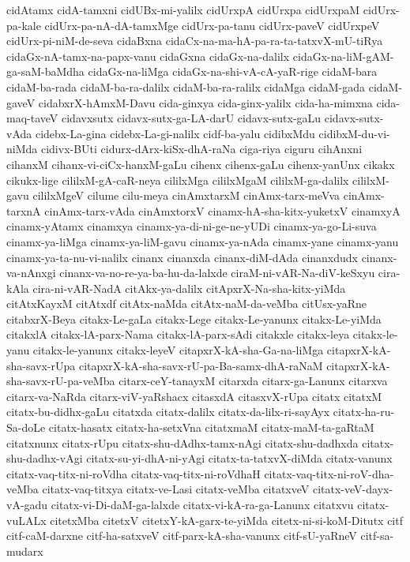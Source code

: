 {cidAtamx
cidA-tamxni
cidUBx-mi-yalilx
cidUrxpA
cidUrxpa
cidUrxpaM
cidUrx-pa-kale
cidUrx-pa-nA-dA-tamxMge
cidUrx-pa-tanu
cidUrx-paveV
cidUrxpeV
cidUrx-pi-niM-de-seva
cidaBxna
cidaCx-na-ma-hA-pa-ra-ta-tatxvX-mU-tiRya
cidaGx-nA-tamx-na-papx-vanu
cidaGxna
cidaGx-na-dalilx
cidaGx-na-liM-gAM-ga-saM-baMdha
cidaGx-na-liMga
cidaGx-na-shi-vA-cA-yaR-rige
cidaM-bara
cidaM-ba-rada
cidaM-ba-ra-dalilx
cidaM-ba-ra-ralilx
cidaMga
cidaM-gada
cidaM-gaveV
cidabxrX-hAmxM-Davu
cida-ginxya
cida-ginx-yalilx
cida-ha-mimxna
cida-maq-taveV
cidavxsutx
cidavx-sutx-ga-LA-darU
cidavx-sutx-gaLu
cidavx-sutx-vAda
cidebx-La-gina
cidebx-La-gi-nalilx
cidf-ba-yalu
cidibxMdu
cidibxM-du-vi-niMda
cidivx-BUti
cidurx-dArx-kiSx-dhA-raNa
ciga-riya
ciguru
cihAnxni
cihanxM
cihanx-vi-ciCx-hanxM-gaLu
cihenx
cihenx-gaLu
cihenx-yanUnx
cikakx
cikukx-lige
cililxM-gA-caR-neya
cililxMga
cililxMgaM
cililxM-ga-dalilx
cililxM-gavu
cililxMgeV
cilume
cilu-meya
cinAmxtarxM
cinAmx-tarx-meVva
cinAmx-tarxnA
cinAmx-tarx-vAda
cinAmxtorxV
cinamx-hA-sha-kitx-yuketxV
cinamxyA
cinamx-yAtamx
cinamxya
cinamx-ya-di-ni-ge-ne-yUDi
cinamx-ya-go-Li-suva
cinamx-ya-liMga
cinamx-ya-liM-gavu
cinamx-ya-nAda
cinamx-yane
cinamx-yanu
cinamx-ya-ta-nu-vi-nalilx
cinanx
cinanxda
cinanx-diM-dAda
cinanxdudx
cinanx-va-nAnxgi
cinanx-va-no-re-ya-ba-hu-da-lalxde
ciraM-ni-vAR-Na-diV-keSxyu
cira-kAla
cira-ni-vAR-NadA
citAkx-ya-dalilx
citApxrX-Na-sha-kitx-yiMda
citAtxKayxM
citAtxdf
citAtx-naMda
citAtx-naM-da-veMba
citUsx-yaRne
citabxrX-Beya
citakx-Le-gaLa
citakx-Lege
citakx-Le-yanunx
citakx-Le-yiMda
citakxlA
citakx-lA-parx-Nama
citakx-lA-parx-sAdi
citakxle
citakx-leya
citakx-le-yanu
citakx-le-yanunx
citakx-leyeV
citapxrX-kA-sha-Ga-na-liMga
citapxrX-kA-sha-savx-rUpa
citapxrX-kA-sha-savx-rU-pa-Ba-samx-dhA-raNaM
citapxrX-kA-sha-savx-rU-pa-veMba
citarx-ceY-tanayxM
citarxda
citarx-ga-Lanunx
citarxva
citarx-va-NaRda
citarx-viV-yaRshacx
citasxdA
citasxvX-rUpa
citatx
citatxM
citatx-bu-didhx-gaLu
citatxda
citatx-dalilx
citatx-da-lilx-ri-sayAyx
citatx-ha-ru-Sa-doLe
citatx-hasatx
citatx-ha-setxVna
citatxmaM
citatx-maM-ta-gaRtaM
citatxnunx
citatx-rUpu
citatx-shu-dAdhx-tamx-nAgi
citatx-shu-dadhxda
citatx-shu-dadhx-vAgi
citatx-su-yi-dhA-ni-yAgi
citatx-ta-tatxvX-diMda
citatx-vanunx
citatx-vaq-titx-ni-roVdha
citatx-vaq-titx-ni-roVdhaH
citatx-vaq-titx-ni-roV-dha-veMba
citatx-vaq-titxya
citatx-ve-Lasi
citatx-veMba
citatxveV
citatx-veV-dayx-vA-gadu
citatx-vi-Di-daM-ga-lalxde
citatx-vi-kA-ra-ga-Lanunx
citatxvu
citatx-vuLALx
citetxMba
citetxV
citetxY-kA-garx-te-yiMda
citetx-ni-si-koM-Ditutx
citf
citf-caM-darxne
citf-ha-satxveV
citf-parx-kA-sha-vanunx
citf-sU-yaRneV
citf-sa-mudarx
}
